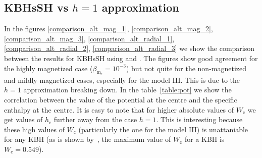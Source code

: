 \documentclass[twocolumn,aps,showpacs,showkeys,prd,superscriptaddress,byrevtex, amsmath]{revtex4-1}
\begin{document}
\begin{appendix}
\section{KBHsSH vs $h = 1$ approximation}\label{komissarov_appendix}

In the figures \ref{comparison_alt_mag_1}, \ref{comparison_alt_mag_2}, \ref{comparison_alt_mag_3}, \ref{comparison_alt_radial_1}, \ref{comparison_alt_radial_2}, \ref{comparison_alt_radial_3} we show the comparison between the results for KBHsSH using \cite{Montero:2007} and \cite{Komissarov:2006}. The figures show good agreement for the highly magnetized case ($\beta_{\mathrm{m}_{\mathrm{c}}} = 10^{-3}$) but not quite for the non-magnetized and mildly magnetized cases, especially for the model III. This is due to the $h = 1$ approximation breaking down. In the table~\ref{table:pot} we show the correlation between the value of the potential at the centre and the specific enthalpy at the centre. It is easy to note that for higher absolute values of $W_{\mathrm{c}}$ we get values of $h_{\mathrm{c}}$ further away from the case $h = 1$. This is interesting because these high values of $W_{\mathrm{c}}$ (particularly the one for the model III) is unattaniable for any KBH (as is shown by~\cite{Abramowicz:1978}, the maximum value of $W_{\mathrm{c}}$ for a KBH is $W_{\mathrm{c}} = 0.549$).



\end{appendix}
\end{document}
